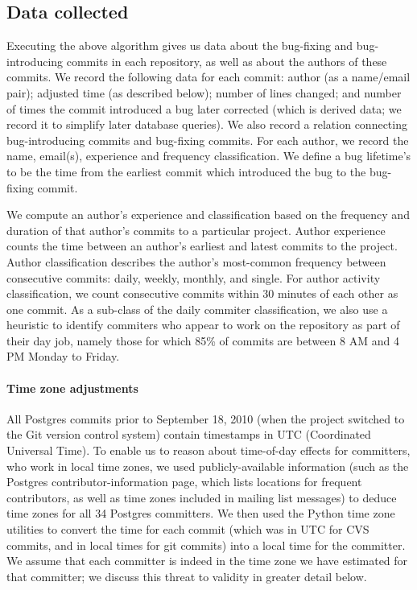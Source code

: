 \subsection{Data collected}
Executing the above algorithm gives us data about the bug-fixing
and bug-introducing commits
in each repository, as well as about the authors of these commits.  We
record the following data for each commit: author (as a name/email
pair); adjusted time (as described below); number of lines changed; 
and number of times the
commit introduced a bug later corrected (which is derived data; we
record it to simplify later database queries). We also record a
relation connecting bug-introducing commits and bug-fixing
commits. For each author, we record the name, email(s), experience and
frequency classification. We define a bug lifetime's to be the time from the
earliest commit which introduced the bug to the bug-fixing commit.

We compute an author's experience and classification based on the
frequency and duration of that author's commits to a particular
project. Author experience counts the time between an author's
earliest and latest commits to the project. Author classification
describes the author's most-common frequency between consecutive
commits: daily, weekly, monthly, and single. For author activity
classification, we count consecutive commits within 30
minutes of each other as one commit. As a sub-class of the daily commiter
classification, we also use a heuristic to identify commiters who
appear to work on the repository as part of their day job, namely
those for which 85\% of commits are between 8 AM and 4 PM Monday to
Friday.

\paragraph{Time zone adjustments}
All Postgres commits prior to September 18, 2010 (when the project
switched to the Git version control system) contain timestamps in UTC
(Coordinated Universal Time). To enable us to reason about time-of-day
effects for committers, who work in local time zones, we used
publicly-available information (such as the Postgres
contributor-information page, which lists locations for frequent
contributors, as well as time zones included in mailing list messages) to deduce
time zones for all 34 Postgres committers. We then used the Python
time zone utilities to convert the time for each commit (which was in
UTC for CVS commits, and in local times for git commits) into a local
time for the committer. We assume that each committer is indeed in
the time zone we have estimated for that committer; 
we discuss this threat to validity in greater detail below.


